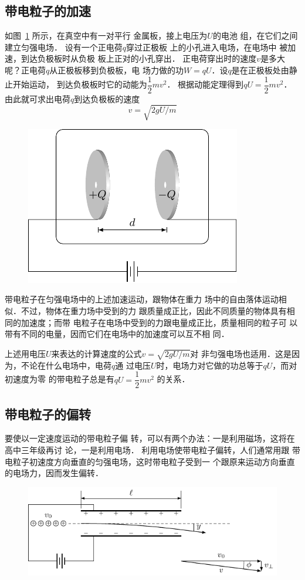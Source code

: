 \subsection{带电粒子的加速}


如图~\ref{fig_B_6-27} 所示，在真空中有一对平行
金属板，接上电压为$U$的电池
组，在它们之间建立匀强电场．
设有一个正电荷$q$穿过正极板
上的小孔进入电场，在电场中
被加速，到达负极板时从负极
板上正对的小孔穿出．
正电荷穿出时的速度$v$是多大呢？正电荷$q$从正极板移到负极板，电
场力做的功$W=qU$．设$q$是在正极板处由静止开始运动，
到达负极板时它的动能为$\dfrac{1}{2}mv^2$．
根据动能定理得到$qU=\dfrac{1}{2}mv^2$．
由此就可求出电荷$q$到达负极板的速度
\[
v=\sqrt{2gU/m}
\]


\begin{figure}[htbp]
	\centering
	\includegraphics{fig/B/6-27.pdf}
	\caption{}\label{fig_B_6-27}
\end{figure}


带电粒子在匀强电场中的上述加速运动，跟物体在重力
场中的自由落体运动相似．不过，物体在重力场中受到的力
跟质量成正比，因此不同质量的物体具有相同的加速度；而带
电粒子在电场中受到的力跟电量成正比，质量相同的粒子可
以带有不同的电量，因而它们在电场中的加速度可以互不相
同．

上述用电压$U$来表达的计算速度的公式$v=\sqrt{2gU/m}$对
非匀强电场也适用．这是因为，不论在什么电场中，电荷$q$通
过电压$U$时，电场力对它做的功总等于$qU$，而对初速度为零
的带电粒子总是有$qU=\dfrac{1}{2}mv^2$
的关系．

\subsection{带电粒子的偏转}


要使以一定速度运动的带电粒子偏
转，可以有两个办法：一是利用磁场，这将在高中三年级再讨
论，一是利用电场．
利用电场使带电粒子偏转，人们通常用跟
带电粒子初速度方向垂直的匀强电场，这时带电粒子受到一
个跟原来运动方向垂直的电场力，因而发生偏转．
\begin{figure}[htbp]
    \centering
    \includegraphics{fig/B/6-28.pdf}
    \caption{}\label{fig_B_6-28}
\end{figure}

